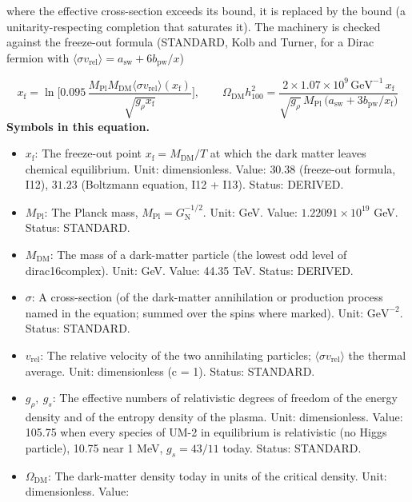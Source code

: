 \documentclass[
  10pt,
]{article}
\providecommand{\tightlist}{%
  \setlength{\itemsep}{0pt}\setlength{\parskip}{0pt}}
\begin{document}
where the effective cross-section exceeds its bound, it is replaced by
the bound (a unitarity-respecting completion that saturates it). The
machinery is checked against the freeze-out formula (STANDARD, Kolb and
Turner, for a Dirac fermion with
\(\langle\sigma v_{\mathrm{rel}}\rangle = a_{\mathrm{sw}} + 6b_{\mathrm{pw}}/x\))

\[ x_{\mathrm{f}} = \ln\Big[0.095\,\frac{M_{\mathrm{Pl}}M_{\mathrm{DM}}\langle\sigma v_{\mathrm{rel}}\rangle(x_{\mathrm{f}})}{\sqrt{g_\rho x_{\mathrm{f}}}}\Big],\qquad \Omega_{\mathrm{DM}}h_{100}^2 = \frac{2\times1.07\times10^9\,\text{GeV}^{-1}\,x_{\mathrm{f}}}{\sqrt{g_\rho}\,M_{\mathrm{Pl}}\,\big(a_{\mathrm{sw}} + 3b_{\mathrm{pw}}/x_{\mathrm{f}}\big)} \]
\textbf{Symbols in this equation.}

\begin{itemize}
\tightlist
\item
  \(x_{\mathrm{f}}\): The freeze-out point
  \(x_{\mathrm{f}} = M_{\mathrm{DM}}/T\) at which the dark matter leaves
  chemical equilibrium. Unit: dimensionless. Value: \(30.38\)
  (freeze-out formula, I12), \(31.23\) (Boltzmann equation, I12 + I13).
  Status: DERIVED.
\item
  \(M_{\mathrm{Pl}}\): The Planck mass,
  \(M_{\mathrm{Pl}} = G_{\mathrm{N}}^{-1/2}\). Unit: GeV. Value:
  \(1.22091\times10^{19}\) GeV. Status: STANDARD.
\item
  \(M_{\mathrm{DM}}\): The mass of a dark-matter particle (the lowest
  odd level of dirac16complex). Unit: GeV. Value: 44.35 TeV. Status:
  DERIVED.
\item
  \(\sigma\): A cross-section (of the dark-matter annihilation or
  production process named in the equation; summed over the spins where
  marked). Unit: \(\mathrm{GeV}^{-2}\). Status: STANDARD.
\item
  \(v_{\mathrm{rel}}\): The relative velocity of the two annihilating
  particles; \(\langle\sigma v_{\mathrm{rel}}\rangle\) the thermal
  average. Unit: dimensionless (c = 1). Status: STANDARD.
\item
  \(g_\rho,\ g_s\): The effective numbers of relativistic degrees of
  freedom of the energy density and of the entropy density of the
  plasma. Unit: dimensionless. Value: 105.75 when every species of UM-2
  in equilibrium is relativistic (no Higgs particle), 10.75 near 1 MeV,
  \(g_s = 43/11\) today. Status: STANDARD.
\item
  \(\Omega_{\mathrm{DM}}\): The dark-matter density today in units of
  the critical density. Unit: dimensionless. Value:

\end{itemize}
\end{document}
